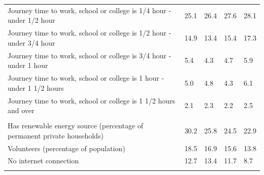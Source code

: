 \documentclass{article}
\begin{document}
\begin{table}[h]
\begin{tabular}{KTTTT}
Journey time to work, school or college is 1/4 hour - under 1/2 hour & 25.1& 26.4& 27.6& 28.1\\
Journey time to work, school or college is 1/2 hour - under 3/4 hour & 14.9& 13.4& 15.4& 17.3\\
Journey time to work, school or college is 3/4 hour - under 1 hour & 5.4& 4.3& 4.7& 5.9\\
Journey time to work, school or college is 1 hour - under 1 1/2 hours & 5.0& 4.8& 4.3& 6.1\\
Journey time to work, school or college is 1 1/2 hours and over & 2.1& 2.3& 2.2& 2.5\\
\hline
    \\ 
    \hline
Has renewable energy source (percentage of permanent private households) & 30.2& 25.8& 24.5& 22.9\\
    \hline
Volunteers (percentage of population) & 18.5& 16.9& 15.6& 13.8\\
    \hline
No internet connection& 12.7& 13.4& 11.7&  8.7\\
\hline
\end{tabular}
\end{table}
\end{document}
